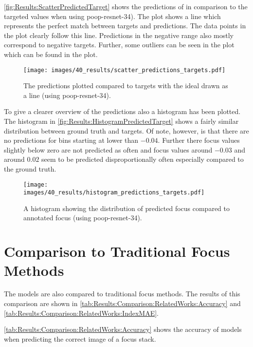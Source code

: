 \autoref{fig:Results:ScatterPredictedTarget} shows the predictions of in comparison to the targeted values when using \acs{poop}-\acs{resnet}-34). The plot shows a line which represents the perfect match between targets and predictions. The data points in the plot clearly follow this line. Predictions in the negative range also mostly correspond to negative targets. Further, some outliers can be seen in the plot which can be found in the plot.


\begin{figure}
    \centering
    \texttt{[image: images/40\_results/scatter\_predictions\_targets.pdf]}
    \caption{The predictions plotted compared to targets with the ideal drawn as a line (using \acs{poop}-\acs{resnet}-34).}
    \label{fig:Results:ScatterPredictedTarget}
\end{figure}

To give a clearer overview of the predictions also a histogram has been plotted. The histogram in \autoref{fig:Results:HistogramPredictedTarget} shows a fairly similar distribution between ground truth and targets. Of note, however, is that there are no predictions for bins starting at lower than $-0.04$. Further there focus values slightly below zero are not predicted as often and focus values around $-0.03$ and around $0.02$ seem to be predicted disproportionally often especially compared to the ground truth.

\begin{figure}
    \centering
    \texttt{[image: images/40\_results/histogram\_predictions\_targets.pdf]}
    \caption{A histogram showing the distribution of predicted focus compared to annotated focus (using \acs{poop}-\acs{resnet}-34).}
    \label{fig:Results:HistogramPredictedTarget}
\end{figure}


\section{Comparison to Traditional Focus Methods}
\label{sec:Results:TraditionalFocusMethods}

The models are also compared to traditional focus methods. The results of this comparison are shown in \autoref{tab:Results:Comparison:RelatedWorks:Accuracy} and \autoref{tab:Results:Comparison:RelatedWorks:IndexMAE}.

\autoref{tab:Results:Comparison:RelatedWorks:Accuracy} shows the accuracy of models when predicting the correct image of a focus stack.

